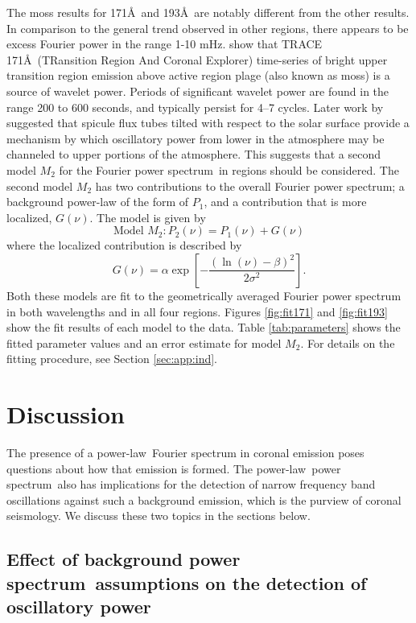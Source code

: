 \documentclass{aastex}
\newcommand{\PS}{power spectrum}
\newcommand{\PL}{power-law}
\newcommand{\Fps}{Fourier \PS}
\begin{document}
{The moss results for 171\AA\ and 193\AA\ are notably different from
the other results.  In comparison to the general trend observed in
other regions, there appears to be excess Fourier power in the range
1-10 mHz.  \cite{2003ApJ...595L..63D} show that TRACE
171\AA\ (TRansition Region And Coronal Explorer) time-series of bright
upper transition region emission above active region plage (also known
as moss) is a source of wavelet power. Periods of significant wavelet
power are found in the range 200 to 600 seconds, and typically persist
for 4–7 cycles.  Later work by \cite{2005ApJ...624L..61D} suggested
that spicule flux tubes tilted with respect to the solar surface
provide a mechanism by which oscillatory power from lower in the
atmosphere may be channeled to upper portions of the atmosphere.  This
suggests that a second model $M_{2}$ for the \Fps\ in regions should
be considered.  The second model $M_{2}$ has two contributions to the
overall \Fps; a background power-law of the form of $P_{1}$, and a
contribution that is more localized, $G(\nu)$.  The model is given by
\begin{equation}
\label{eqn:pwrlawbump}
\mbox{Model $M_{2}$}: P_{2}(\nu) = P_{1}(\nu) + G(\nu)
\end{equation}
where the localized contribution is described by
\begin{equation}
\label{eqn:bump}
G(\nu) = \alpha\exp\left[-\frac{(\ln(\nu)-\beta)^{2}}{2\sigma^{2}}\right].
\end{equation}
Both these models are fit to the geometrically averaged Fourier power
spectrum in both wavelengths and in all four regions.  Figures
\ref{fig:fit171} and \ref{fig:fit193} show the fit results of
each model to the data.  Table \ref{tab:parameters} shows the fitted
parameter values and an error estimate for model $M_{2}$.  For details
on the fitting procedure, see Section \ref{sec:app:ind}.

\section{Discussion}
The presence of a \PL\ Fourier spectrum in coronal emission poses
questions about how that emission is formed.  The \PL\ \PS\ also has
implications for the detection of narrow frequency band oscillations
against such a background emission, which is the purview of coronal
seismology.  We discuss these two topics in the sections below.

\subsection{Effect of background \PS\ assumptions on the
  detection of oscillatory power}
\label{ssec:corseis}

}
\end{document}
